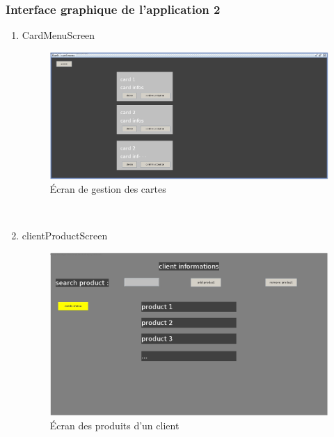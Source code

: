 \documentclass[../rapport.tex]{subfiles}
\begin{document}
\subsubsection{Interface graphique de l'application 2}
\begin{enumerate}
	\item{CardMenuScreen}\\
	\begin{figure}[h!]
		\centering\includegraphics[scale=0.15]{ressources/photos_diagrammes/extensionTheo/gui2/cardMenu.jpg}
		\caption{Écran de gestion des cartes}
	\end{figure}\\

\item{clientProductScreen}\\
	\begin{figure}[h!]
		\centering\includegraphics[scale=0.15]{ressources/photos_diagrammes/extensionTheo/gui2/clientProductMenu.jpg}
		\caption{Écran des produits d'un client}
	\end{figure}

\end{enumerate}
\end{document}

